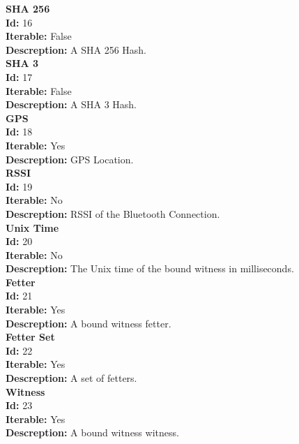 \documentclass[11pt]{article}
\begin{document}
\noindent
\textbf{SHA 256} \\
\indent \textbf{Id:} 16 \\
\indent \textbf{Iterable:} False \\
\indent \textbf{Descreption:} A SHA 256 Hash. \\

\noindent
\textbf{SHA 3} \\
\indent \textbf{Id:} 17 \\
\indent \textbf{Iterable:} False \\
\indent \textbf{Descreption:} A SHA 3 Hash. \\

\noindent
\textbf{GPS} \\
\indent \textbf{Id:} 18 \\
\indent \textbf{Iterable:} Yes \\
\indent \textbf{Descreption:} GPS Location. \\

\noindent
\textbf{RSSI} \\
\indent \textbf{Id:} 19 \\
\indent \textbf{Iterable:} No \\
\indent \textbf{Descreption:} RSSI of the Bluetooth Connection. \\

\noindent
\textbf{Unix Time} \\
\indent \textbf{Id:} 20 \\
\indent \textbf{Iterable:} No \\
\indent \textbf{Descreption:} The Unix time of the bound witness in milliseconds. \\

\noindent
\textbf{Fetter} \\
\indent \textbf{Id:} 21 \\
\indent \textbf{Iterable:} Yes \\
\indent \textbf{Descreption:} A bound witness fetter. \\

\noindent
\textbf{Fetter Set} \\
\indent \textbf{Id:} 22 \\
\indent \textbf{Iterable:} Yes \\
\indent \textbf{Descreption:} A set of fetters. \\

\noindent
\textbf{Witness} \\
\indent \textbf{Id:} 23 \\
\indent \textbf{Iterable:} Yes \\
\indent \textbf{Descreption:} A bound witness witness. \\
\end{document}
